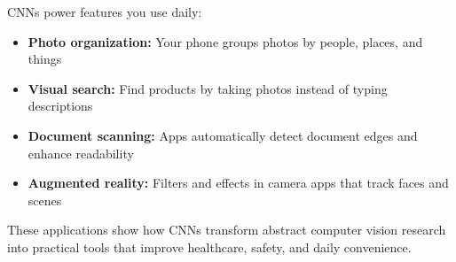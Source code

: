 CNNs power features you use daily:
\begin{itemize}
    \item \textbf{Photo organization:} Your phone groups photos by people, places, and things
    \item \textbf{Visual search:} Find products by taking photos instead of typing descriptions
    \item \textbf{Document scanning:} Apps automatically detect document edges and enhance readability
    \item \textbf{Augmented reality:} Filters and effects in camera apps that track faces and scenes
\end{itemize}

These applications show how CNNs transform abstract computer vision research into practical tools that improve healthcare, safety, and daily convenience.

